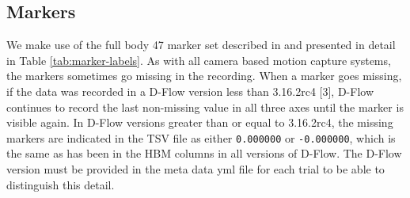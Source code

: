 \documentclass[fleqn,10pt]{wlpeerj}
\begin{document}
\subsection*{Markers}
%
We make use of the full body 47 marker set described in \cite{Bogert2013} and
presented in detail in Table \ref{tab:marker-labels}. As with all camera based
motion capture systems, the markers sometimes go missing in the recording. When
a marker goes missing, if the data was recorded in a D-Flow version less than
3.16.2rc4 [3], D-Flow continues to record the last non-missing value in all
three axes until the marker is visible again. In D-Flow versions greater than
or equal to 3.16.2rc4, the missing markers are indicated in the TSV file as
either \verb|0.000000| or \verb|-0.000000|, which is the same as has been in
the HBM columns in all versions of D-Flow. The D-Flow version must be provided
in the meta data yml file for each trial to be able to distinguish this detail.
%
\end{document}
